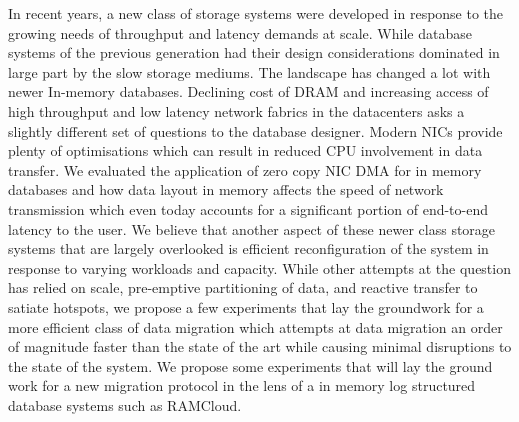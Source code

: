
In recent years, a new class of storage systems were developed in response to
the growing needs of throughput and latency demands at scale. While 
database systems of the previous generation had their design considerations dominated
in large part by the slow storage mediums. The landscape has changed a lot with 
newer In-memory databases. Declining cost of DRAM and increasing access of high
throughput and low latency network fabrics in the datacenters asks a slightly 
different set of questions to the database designer. Modern NICs provide plenty 
of optimisations which can result in reduced CPU involvement in data transfer.
We evaluated the application of zero copy NIC DMA for in memory databases and 
how data layout in memory affects the speed of network transmission which even today
accounts for a significant portion of end-to-end latency to the user. We believe
that another aspect of these newer class storage systems that are largely overlooked 
is efficient reconfiguration of the system in response to varying workloads and capacity.
While other attempts at the question has relied on scale, pre-emptive partitioning of data,
and reactive transfer to satiate hotspots, we propose a few experiments that lay the groundwork
for a more efficient class of data migration which attempts at data migration an order of 
magnitude faster than the state of the art while causing minimal disruptions to the state 
of the system. We propose some experiments that will lay the ground work for a new migration
protocol in the lens of a in memory log structured database systems such as RAMCloud.

